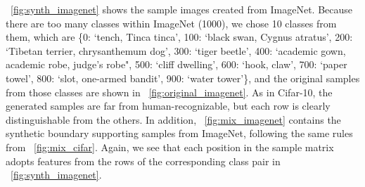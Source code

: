 \documentclass{article}
\begin{document}
{\figurename~\ref{fig:synth_imagenet} shows the sample images created from ImageNet.
Because there are too many classes within ImageNet (1000), we chose 10 classes from them, which are 
\{0: `tench, Tinca tinca',
100: `black swan, Cygnus atratus',
200: `Tibetan terrier, chrysanthemum dog',
300: `tiger beetle',
400: `academic gown, academic robe, judge's robe",
500: `cliff dwelling',
600: `hook, claw',
700: `paper towel',
800: `slot, one-armed bandit',
900: `water tower'\}, 
and the original samples from those classes are shown in \figurename~\ref{fig:original_imagenet}.
As in Cifar-10, the generated samples are far from human-recognizable, but each row is clearly distinguishable from the others.
In addition, \figurename~\ref{fig:mix_imagenet} contains the synthetic boundary supporting samples from ImageNet, following the same rules from \figurename~\ref{fig:mix_cifar}.
Again, we see that each position in the sample matrix adopts features from the rows of the corresponding class pair in \figurename~\ref{fig:synth_imagenet}.















}
\end{document}
